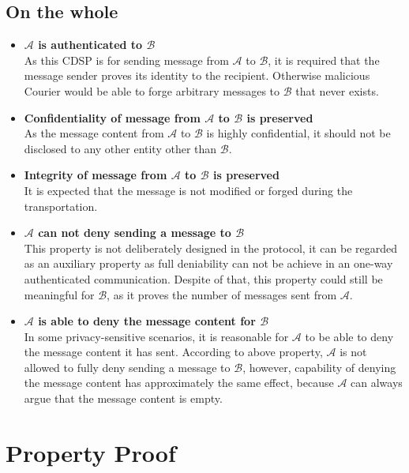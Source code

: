\subsection{On the whole}
\begin{itemize}
\item \textbf{$\mathcal{A}$ is authenticated to $\mathcal{B}$} \\
As this CDSP is for sending message from $ \mathcal{A} $ to $ \mathcal{B} $, it is required that the message sender proves its identity to the recipient. Otherwise malicious Courier would be able to forge arbitrary messages to $ \mathcal{B} $ that never exists.

\item \textbf{Confidentiality of message from $\mathcal{A}$ to $\mathcal{B}$ is preserved} \\
As the message content from $ \mathcal{A} $ to $ \mathcal{B} $ is highly confidential, it should not be disclosed to any other entity other than $ \mathcal{B} $.

\item \textbf{Integrity of message from $\mathcal{A}$ to $\mathcal{B}$ is preserved} \\
It is expected that the message is not modified or forged during the transportation.

\item \textbf{$\mathcal{A}$ can not deny sending a message to $\mathcal{B}$} \\
This property is not deliberately designed in the protocol, it can be regarded as an auxiliary property as full deniability can not be achieve in an one-way authenticated communication. Despite of that, this property could still be meaningful for $ \mathcal{B} $, as it proves the number of messages sent from $ \mathcal{A} $.

\item \textbf{$\mathcal{A}$ is able to deny the message content for $\mathcal{B}$} \\
In some privacy-sensitive scenarios, it is reasonable for $ \mathcal{A} $ to be able to deny the message content it has sent. According to above property, $ \mathcal{A} $ is not allowed to fully deny sending a message to $ \mathcal{B} $, however, capability of denying the message content has approximately the same effect, because $ \mathcal{A} $ can always argue that the message content is empty.
\end{itemize}

\section{Property Proof}
